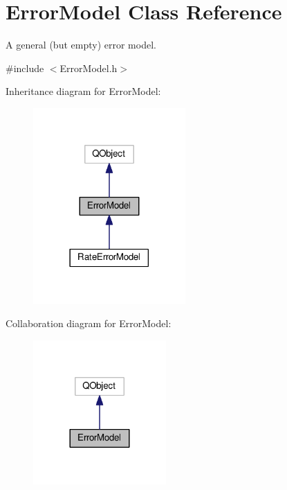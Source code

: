 \hypertarget{classErrorModel}{}\section{Error\+Model Class Reference}
\label{classErrorModel}


A general (but empty) error model.  




{\ttfamily \#include $<$Error\+Model.\+h$>$}



Inheritance diagram for Error\+Model\+:\nopagebreak
\begin{figure}[H]
\begin{center}
\leavevmode
\includegraphics[width=165pt]{classErrorModel__inherit__graph}
\end{center}
\end{figure}


Collaboration diagram for Error\+Model\+:\nopagebreak
\begin{figure}[H]
\begin{center}
\leavevmode
\includegraphics[width=144pt]{classErrorModel__coll__graph}
\end{center}
\end{figure}
